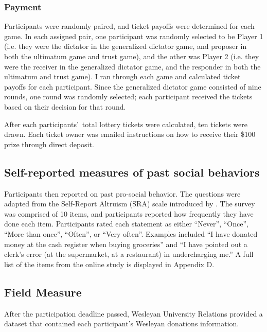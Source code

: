 \documentclass[12pt]{article}
\begin{document}
\subsubsection{Payment}

Participants were randomly paired, and ticket payoffs were determined for each game. In each assigned pair, one participant was randomly selected to be Player 1 (i.e. they were the dictator in the generalized dictator game, and proposer in both the ultimatum game and trust game), and the other was Player 2 (i.e. they were the receiver in the generalized dictator game, and the responder in both the ultimatum and trust game). I ran through each game and calculated ticket payoffs for each participant. Since the generalized dictator game consisted of nine rounds, one round was randomly selected; each participant received the tickets based on their decision for that round. 

After each participants\rq \ total lottery tickets were calculated, ten tickets were drawn. Each ticket owner was emailed instructions on how to receive their \$100 prize through direct deposit. 

\subsection{Self-reported measures of past social behaviors}

Participants then reported on past pro-social behavior. The questions were adapted from the Self-Report Altruism (SRA) scale introduced by \cite{rushton_chrisjohn_fekken_1981}. The survey was comprised of 10 items, and participants reported how frequently they have done each item. Participants rated each statement as either ``Never'', ``Once'', ``More than once'', ``Often'', or ``Very often''. Examples included ``I have donated money at the cash register when buying groceries'' and ``I have pointed out a clerk\rq s error (at the supermarket, at a restaurant) in undercharging me.'' A full list of the items from the online study is displayed in Appendix D. 

\subsection{Field Measure}

After the participation deadline passed, Wesleyan University Relations provided a dataset that contained each participant\rq s Wesleyan donations information.
\end{document}
